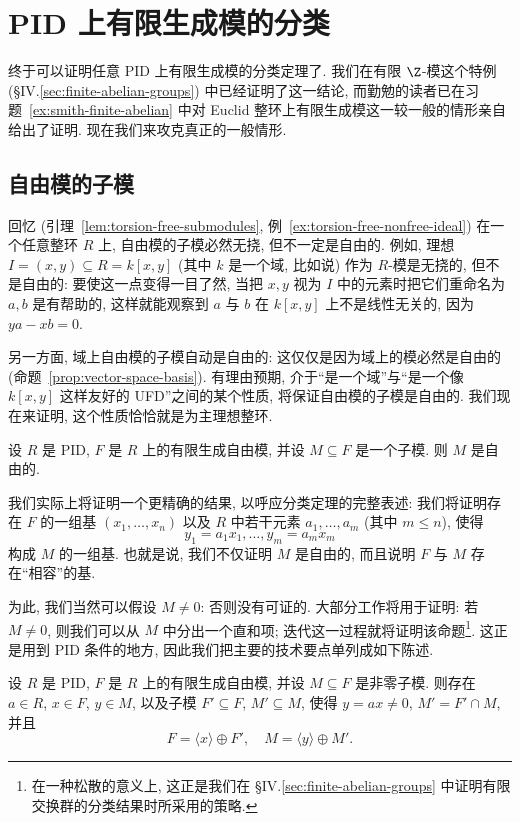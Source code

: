 \section{PID 上有限生成模的分类}\label{sec:pid-fg-classification}

终于可以证明任意 PID 上有限生成模的分类定理了. 我们在有限 $\Z$-模这个特例 (§IV.\ref{sec:finite-abelian-groups}) 中已经证明了这一结论, 而勤勉的读者已在习题~\ref{ex:smith-finite-abelian} 中对 Euclid 整环上有限生成模这一较一般的情形亲自给出了证明. 现在我们来攻克真正的一般情形.

\subsection{自由模的子模}\label{subsec:submodules-free}

回忆 (引理~\ref{lem:torsion-free-submodules}, 例~\ref{ex:torsion-free-nonfree-ideal}) 在一个任意整环 $R$ 上, 自由模的子模必然无挠, 但不一定是自由的. 例如, 理想 $I=(x,y)\subseteq R=k[x,y]$ (其中 $k$ 是一个域, 比如说) 作为 $R$-模是无挠的, 但不是自由的: 要使这一点变得一目了然, 当把 $x,y$ 视为 $I$ 中的元素时把它们重命名为 $a,b$ 是有帮助的, 这样就能观察到 $a$ 与 $b$ 在 $k[x,y]$ 上不是线性无关的, 因为 $ya-xb=0$.

另一方面, 域上自由模的子模自动是自由的: 这仅仅是因为域上的模必然是自由的 (命题~\ref{prop:vector-space-basis}). 有理由预期, 介于``是一个域''与``是一个像 $k[x,y]$ 这样友好的 UFD''之间的某个性质, 将保证自由模的子模是自由的. 我们现在来证明, 这个性质恰恰就是为主理想整环.

\begin{proposition}\label{prop:submodule-free-pid}
设 $R$ 是 PID, $F$ 是 $R$ 上的有限生成自由模, 并设 $M\subseteq F$ 是一个子模. 则 $M$ 是自由的.
\end{proposition}

我们实际上将证明一个更精确的结果, 以呼应分类定理的完整表述: 我们将证明存在 $F$ 的一组基 $(x_1,\ldots,x_n)$ 以及 $R$ 中若干元素 $a_1,\ldots,a_m$ (其中 $m\le n$), 使得
$$
y_1=a_1x_1,\ldots,y_m=a_mx_m
$$
构成 $M$ 的一组基. 也就是说, 我们不仅证明 $M$ 是自由的, 而且说明 $F$ 与 $M$ 存在``相容''的基.

为此, 我们当然可以假设 $M\neq 0$: 否则没有可证的. 大部分工作将用于证明: 若 $M\neq 0$, 则我们可以从 $M$ 中分出一个直和项; 迭代这一过程就将证明该命题\footnote{在一种松散的意义上, 这正是我们在 §IV.\ref{sec:finite-abelian-groups} 中证明有限交换群的分类结果时所采用的策略.}. 这正是用到 PID 条件的地方, 因此我们把主要的技术要点单列成如下陈述.

\begin{lemma}\label{lem:split-direct-summand}
设 $R$ 是 PID, $F$ 是 $R$ 上的有限生成自由模, 并设 $M\subseteq F$ 是非零子模. 则存在 $a\in R$, $x\in F$, $y\in M$, 以及子模 $F'\subseteq F$, $M'\subseteq M$, 使得 $y=ax\neq0$, $M'=F'\cap M$, 并且
$$
F=\langle x\rangle\oplus F',\quad M=\langle y\rangle\oplus M'.
$$
\end{lemma}


